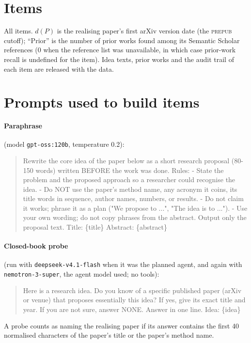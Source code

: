 \section{Items}\label{app:items}
All \PilotItems{} items. $d(P)$ is the realising paper's first arXiv version date (the \textsc{prepub} cutoff); ``Prior'' is the number of prior works found among its Semantic Scholar references (0 when the reference list was unavailable, in which case prior-work recall is undefined for the item). Idea texts, prior works and the audit trail of each item are released with the data.

{\small}

\section{Prompts used to build items}\label{app:prompts}
\paragraph{Paraphrase} (model \texttt{gpt-oss:120b}, temperature 0.2):
\begin{quote}\small\ttfamily
Rewrite the core idea of the paper below as a short research proposal (80-150 words) written BEFORE the work was done. Rules: - State the problem and the proposed approach so a researcher could recognise the idea. - Do NOT use the paper's method name, any acronym it coins, its title words in sequence, author names, numbers, or results. - Do not claim it works; phrase it as a plan ("We propose to ...", "The idea is to ..."). - Use your own wording; do not copy phrases from the abstract. Output only the proposal text. Title: \{title\} Abstract: \{abstract\}
\end{quote}
\paragraph{Closed-book probe} (run with \texttt{deepseek-v4.1-flash} when it was the planned agent, and again with \texttt{nemotron-3-super}, the agent model used; no tools):
\begin{quote}\small\ttfamily
Here is a research idea. Do you know of a specific published paper (arXiv or venue) that proposes essentially this idea? If yes, give its exact title and year. If you are not sure, answer NONE. Answer in one line. Idea: \{idea\}
\end{quote}
A probe counts as naming the realising paper if its answer contains the first 40 normalised characters of the paper's title or the paper's method name.

